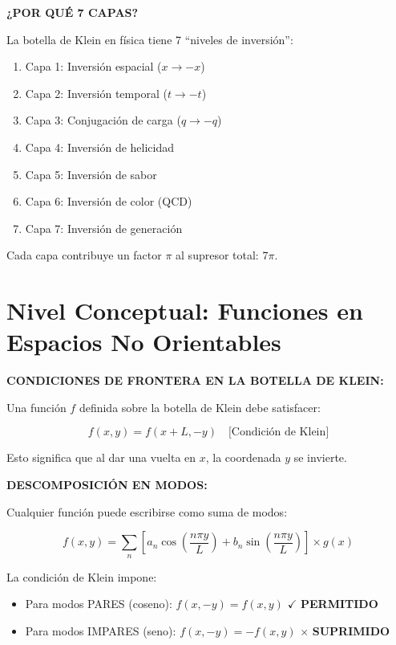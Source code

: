 \textbf{¿POR QUÉ 7 CAPAS?}

La botella de Klein en física tiene 7 ``niveles de inversión'':
\begin{enumerate}
    \item Capa 1: Inversión espacial ($x \to -x$)
    \item Capa 2: Inversión temporal ($t \to -t$)
    \item Capa 3: Conjugación de carga ($q \to -q$)
    \item Capa 4: Inversión de helicidad
    \item Capa 5: Inversión de sabor
    \item Capa 6: Inversión de color (QCD)
    \item Capa 7: Inversión de generación
\end{enumerate}

Cada capa contribuye un factor $\pi$ al supresor total: $7\pi$.


\section{Nivel Conceptual: Funciones en Espacios No Orientables}

\textbf{CONDICIONES DE FRONTERA EN LA BOTELLA DE KLEIN:}

Una función $f$ definida sobre la botella de Klein debe satisfacer:

\begin{equation}
f(x, y) = f(x + L, -y) \quad \text{[Condición de Klein]}
\end{equation}

Esto significa que al dar una vuelta en $x$, la coordenada $y$ se invierte.

\textbf{DESCOMPOSICIÓN EN MODOS:}

Cualquier función puede escribirse como suma de modos:

\begin{equation}
f(x, y) = \sum_n \left[a_n \cos\left(\frac{n\pi y}{L}\right) + b_n \sin\left(\frac{n\pi y}{L}\right)\right] \times g(x)
\end{equation}

La condición de Klein impone:

\begin{itemize}
    \item Para modos PARES (coseno): $f(x, -y) = f(x, y)$ $\checkmark$ \textbf{PERMITIDO}
    \item Para modos IMPARES (seno): $f(x, -y) = -f(x, y)$ $\times$ \textbf{SUPRIMIDO}
\end{itemize}

